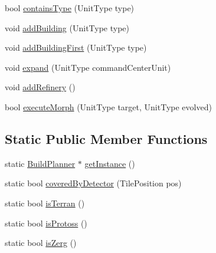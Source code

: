 \begin{DoxyCompactItemize}
bool \hyperlink{class_build_planner_a1e228c42f60d883365f02a2642a5fcbc}{containsType} (UnitType type)
\item 
void \hyperlink{class_build_planner_ab25b205a10565884465fa94921181a0e}{addBuilding} (UnitType type)
\item 
void \hyperlink{class_build_planner_aaf9cda4aeffb69fd68ec92dd9b13fce4}{addBuildingFirst} (UnitType type)
\item 
void \hyperlink{class_build_planner_a8d971de74d640a3db44a6fc99876f195}{expand} (UnitType commandCenterUnit)
\item 
void \hyperlink{class_build_planner_aa446d469525b760904213b30109549ee}{addRefinery} ()
\item 
bool \hyperlink{class_build_planner_a326d634092ab9f7de4118b1697de267f}{executeMorph} (UnitType target, UnitType evolved)
\end{DoxyCompactItemize}
\subsection*{Static Public Member Functions}
\begin{DoxyCompactItemize}
\item 
static \hyperlink{class_build_planner}{BuildPlanner} $\ast$ \hyperlink{class_build_planner_a1669ed63fac6eba75cf08ab926eccd83}{getInstance} ()
\item 
static bool \hyperlink{class_build_planner_a406d5db82adf5f5d2fba55dbdcb23e9b}{coveredByDetector} (TilePosition pos)
\item 
static bool \hyperlink{class_build_planner_aca9b481c6316ae5d11195bf18a3b5053}{isTerran} ()
\item 
static bool \hyperlink{class_build_planner_ab5fd2e205f8804a2bbf2297dec8e340d}{isProtoss} ()
\item 
static bool \hyperlink{class_build_planner_ad1598add8a5136c7c85a207c656fd26f}{isZerg} ()
\end{DoxyCompactItemize}
